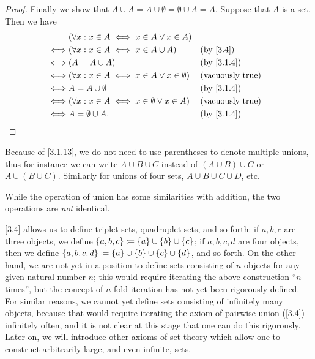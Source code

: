 \begin{proof}
	Finally we show that \(A \cup A = A \cup \emptyset = \emptyset \cup A = A\).
	Suppose that \(A\) is a set.
	Then we have
	\begin{align*}
		     & (\forall x : x \in A \iff x \in A \lor x \in A)                                      \\
		\iff & (\forall x : x \in A \iff x \in A \cup A)               &  & \by{3.4}                \\
		\iff & (A = A \cup A)                                          &  & \by{3.1.4}              \\
		\iff & (\forall x : x \in A \iff x \in A \lor x \in \emptyset) &  & \text{(vacuously true)} \\
		\iff & A = A \cup \emptyset                                    &  & \by{3.1.4}              \\
		\iff & (\forall x : x \in A \iff x \in \emptyset \lor x \in A) &  & \text{(vacuously true)} \\
		\iff & A = \emptyset \cup A.                                   &  & \by{3.1.4}
	\end{align*}
\end{proof}

\begin{note}
	Because of \cref{3.1.13}, we do not need to use parentheses to denote multiple unions, thus for instance we can write \(A \cup B \cup C\) instead of \((A \cup B) \cup C\) or \(A \cup (B \cup C)\).
	Similarly for unions of four sets, \(A \cup B \cup C \cup D\), etc.
\end{note}

\begin{rmk}\label{3.1.14}
	While the operation of union has some similarities with addition, the two operations are \emph{not} identical.
\end{rmk}

\begin{note}
	\cref{3.4} allows us to define triplet sets, quadruplet sets, and so forth: if \(a, b, c\) are three objects, we define \(\left\lbrace a, b, c\right\rbrace \coloneqq \left\lbrace a\right\rbrace \cup \left\lbrace b\right\rbrace \cup \left\lbrace c\right\rbrace\);
	if \(a, b, c, d\) are four objects, then we define \(\left\lbrace a, b, c, d\right\rbrace \coloneqq \left\lbrace a\right\rbrace \cup \left\lbrace b\right\rbrace \cup \left\lbrace c\right\rbrace \cup \left\lbrace d\right\rbrace\), and so forth.
	On the other hand, we are not yet in a position to define sets consisting of \(n\) objects for any given natural number \(n\);
	this would require iterating the above construction ``\(n\) times'', but the concept of \(n\)-fold iteration has not yet been rigorously defined.
	For similar reasons, we cannot yet define sets consisting of infinitely many objects, because that would require iterating the axiom of pairwise union (\cref{3.4}) infinitely often, and it is not clear at this stage that one can do this rigorously.
	Later on, we will introduce other axioms of set theory which allow one to construct arbitrarily large, and even infinite, sets.
\end{note}

